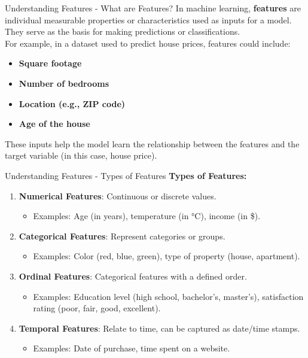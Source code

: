 \documentclass[aspectratio=169]{beamer}
\begin{document}
\begin{frame}[fragile]{Understanding Features - What are Features?}
    In machine learning, \textbf{features} are individual measurable properties or characteristics used as inputs for a model. They serve as the basis for making predictions or classifications.\\

    For example, in a dataset used to predict house prices, features could include:
    \begin{itemize}
        \item \textbf{Square footage}
        \item \textbf{Number of bedrooms}
        \item \textbf{Location (e.g., ZIP code)}
        \item \textbf{Age of the house}
    \end{itemize}
    
    These inputs help the model learn the relationship between the features and the target variable (in this case, house price).
\end{frame}

\begin{frame}[fragile]{Understanding Features - Types of Features}
    \textbf{Types of Features:}
    \begin{enumerate}
        \item \textbf{Numerical Features}: Continuous or discrete values.
        \begin{itemize}
            \item Examples: Age (in years), temperature (in °C), income (in \$).
        \end{itemize}
        
        \item \textbf{Categorical Features}: Represent categories or groups.
        \begin{itemize}
            \item Examples: Color (red, blue, green), type of property (house, apartment).
        \end{itemize}
        
        \item \textbf{Ordinal Features}: Categorical features with a defined order.
        \begin{itemize}
            \item Examples: Education level (high school, bachelor's, master's), satisfaction rating (poor, fair, good, excellent).
        \end{itemize}
        
        \item \textbf{Temporal Features}: Relate to time, can be captured as date/time stamps.
        \begin{itemize}
            \item Examples: Date of purchase, time spent on a website.
        \end{itemize}
    \end{enumerate}
\end{frame}
\end{document}
